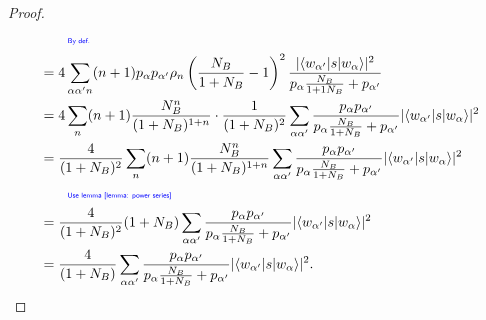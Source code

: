 \documentclass[../../note.tex]{subfiles}
\begin{document}
\begin{proof}
\begin{align}
    &\qquad\text{\color{blue}{\tiny\sffamily By def.}} \nonumber \\
    &= 4 \sum_{\alpha \alpha^\prime n} (n+1) p_{\alpha} p_{\alpha^\prime} \rho_n \left(\frac{N_B}{1+N_B} - 1\right)^2 \frac{\vert \langle w_{\alpha^\prime} \vert s \vert w_{\alpha} \rangle \vert^2}{p_{\alpha} \frac{N_B}{1+1N_B} + p_{\alpha^\prime}} \\
    &= 4 \sum_{n} (n+1) \frac{N_B^n}{(1+N_B)^{1+n}} \cdot \frac{1}{(1+N_B)^2} \sum_{\alpha \alpha^\prime} \frac{p_{\alpha} p_{\alpha^\prime}}{p_{\alpha} \frac{N_B}{1+N_B} + p_{\alpha^\prime}} \vert \langle w_{\alpha^\prime} \vert s\vert w_{\alpha} \rangle \vert^2 \\
    &= \frac{4}{(1+N_B)^2} \sum_{n} (n+1) \frac{N_B^n}{(1+N_B)^{1+n}} \sum_{\alpha \alpha^\prime} \frac{p_{\alpha} p_{\alpha^\prime}}{p_{\alpha} \frac{N_B}{1+N_B} + p_{\alpha^\prime}} \vert \langle w_{\alpha^\prime} \vert s\vert w_{\alpha} \rangle \vert^2 \\
    &\qquad\text{\color{blue}{\tiny\sffamily Use lemma \ref{lemma: power series}}} \nonumber \\
    &= \frac{4}{(1+N_B)^2} (1+N_B) \sum_{\alpha \alpha^\prime} \frac{p_{\alpha} p_{\alpha^\prime}}{p_{\alpha} \frac{N_B}{1+N_B} + p_{\alpha^\prime}} \vert \langle w_{\alpha^\prime} \vert s\vert w_{\alpha} \rangle \vert^2 \\
    &= \frac{4}{(1+N_B)} \sum_{\alpha \alpha^\prime} \frac{p_{\alpha} p_{\alpha^\prime}}{p_{\alpha} \frac{N_B}{1+N_B} + p_{\alpha^\prime}} \vert \langle w_{\alpha^\prime} \vert s\vert w_{\alpha} \rangle \vert^2.
\end{align}
\end{proof}
\end{document}

